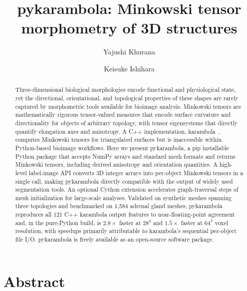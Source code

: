 \documentclass[times, twoside, watermark]{zHenriquesLab-StyleBioRxiv}
\newcommand{\replaced}[3][]{#2}     %
\begin{document}
\title{pykarambola: Minkowski tensor morphometry of 3D structures}

\author[1, \Letter]{Yajushi Khurana}
\author[1,2,\Letter]{Keisuke Ishihara}

\maketitle


\section*{Abstract}

\begin{abstract}
Three-dimensional biological morphologies encode functional and physiological state, yet the directional, orientational, and topological properties of these shapes are rarely captured by morphometric tools available for bioimage analysis.
Minkowski tensors are mathematically rigorous tensor-valued measures that encode surface curvature and directionality for objects of arbitrary topology, with tensor eigensystems that directly quantify elongation axes and anisotropy.
A C++ implementation, karambola~\cite{Schaller2020karambola}, computes Minkowski tensors for triangulated surfaces but is inaccessible within Python-based bioimage workflows.
Here we present pykarambola, a pip installable Python package that accepts NumPy arrays and standard mesh formats and returns Minkowski tensors, including derived anisotropy and orientation quantities.
A high-level label-image API converts 3D integer arrays into per-object Minkowski tensors in a single call, making pykarambola directly compatible with the output of widely used segmentation tools.
An optional Cython extension accelerates graph-traversal steps of mesh initialization for large-scale analyses.
\replaced{Validated on synthetic meshes spanning three topologies and benchmarked}{Benchmarked} on 1{,}584 adrenal gland meshes, pykarambola reproduces all 121 C++ karambola output features to near-floating-point agreement and, in the pure-Python build, is $2.8\times$ faster at $28^3$ and $1.5\times$ faster at $64^3$ voxel resolution, with speedups primarily attributable to karambola's sequential per-object file I/O.
pykarambola is freely available as an open-source software package.
\end{abstract}
\end{document}
